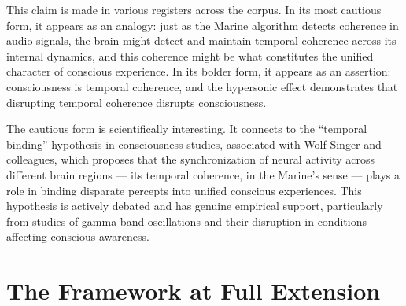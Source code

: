 This claim is made in various registers across the corpus.
In its most cautious form, it appears as an analogy: just
as the Marine algorithm detects coherence in audio signals,
the brain might detect and maintain temporal coherence across
its internal dynamics, and this coherence might be what
constitutes the unified character of conscious experience.
In its bolder form, it appears as an assertion: consciousness
is temporal coherence, and the hypersonic effect demonstrates
that disrupting temporal coherence disrupts consciousness.

The cautious form is scientifically interesting. It connects
to the ``temporal binding'' hypothesis in consciousness studies,
associated with Wolf Singer and colleagues, which proposes
that the synchronization of neural activity across different
brain regions --- its temporal coherence, in the Marine's
sense --- plays a role in binding disparate percepts into
unified conscious experiences. This hypothesis is actively
debated and has genuine empirical support, particularly
from studies of gamma-band oscillations and their disruption
in conditions affecting conscious awareness.





\section{The Framework at Full Extension}
\label{sec:full-extension}

